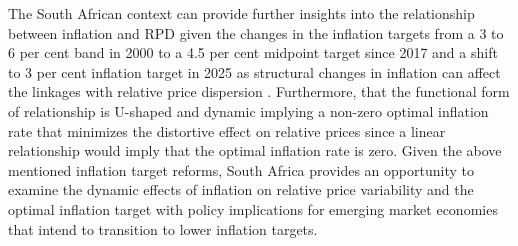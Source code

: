 \documentclass[
  letterpaper,
  DIV=11,
  numbers=noendperiod]{scrartcl}
\begin{document}
The South African context can provide further insights into the
relationship between inflation and RPD given the changes in the
inflation targets from a 3 to 6 per cent band in 2000 to a 4.5 per cent
midpoint target since 2017 and a shift to 3 per cent inflation target in
2025 as structural changes in inflation can affect the linkages with
relative price dispersion \citep{caglayan2003}. Furthermore, that the
functional form of relationship is U-shaped and dynamic
\citep{fielding2000, choi2010} implying a non-zero optimal inflation
rate that minimizes the distortive effect on relative prices since a
linear relationship would imply that the optimal inflation rate is zero.
Given the above mentioned inflation target reforms, South Africa
provides an opportunity to examine the dynamic effects of inflation on
relative price variability and the optimal inflation target with policy
implications for emerging market economies that intend to transition to
lower inflation targets.
\end{document}
